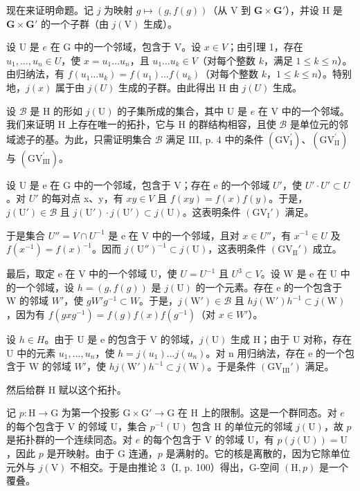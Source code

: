 现在来证明命题。记 \(j\) 为映射 \(g \mapsto (g, f(g))\)（从 V 到 \(\mathbf{G} \times \mathbf{G}'\)），并设 H 是 \(\mathbf{G} \times \mathbf{G}'\) 的一个子群（由 \(j(\mathrm{V})\) 生成）。

设 U 是 \(e\) 在 G 中的一个邻域，包含于 V。设 \(x \in V\)；由引理 1，存在 \(u_1, \ldots, u_n \in U\)，使 \(x = u_1 \ldots u_n\)，且 \(u_1 \ldots u_k \in V\)（对每个整数 \(k\)，满足 \(1 \leqslant k \leqslant n\)）。由归纳法，有 \(f(u_1 \ldots u_k) = f(u_1) \ldots f(u_k)\)（对每个整数 \(k\)，\(1 \leqslant k \leqslant n\)）。特别地，\(j(x)\) 属于由 \(j(U)\) 生成的子群。由此得出 H 由 \(j(U)\) 生成。

设 \(\mathcal{B}\) 是 H 的形如 \(j(\mathrm{U})\) 的子集所成的集合，其中 U 是 \(e\) 在 V 中的一个邻域。我们来证明 H 上存在唯一的拓扑，它与 H 的群结构相容，且使 \(\mathcal{B}\) 是单位元的邻域滤子的基。为此，只需证明集合 \(\mathcal{B}\) 满足 III, p. 4 中的条件 \((\mathrm{GV}_{\mathrm{I}}^{\prime})\)、\((\mathrm{GV}_{\mathrm{II}}^{\prime})\) 与 \((\mathrm{GV}_{\mathrm{III}}^{\prime})\)。

设 U 是 e 在 G 中的一个邻域，包含于 V；存在 e 的一个邻域 \(U'\)，使 \(U' \cdot U' \subset U\)。对 \(U'\) 的每对点 x、y，有 \(xy \in V\) 且 \(f(xy) = f(x)f(y)\)。于是，\(j(\mathrm{U}') \in \mathcal{B}\) 且 \(j(\mathrm{U}') \cdot j(\mathrm{U}') \subset j(\mathrm{U})\)。这表明条件 \((\mathrm{GV}_{\mathrm{I}}')\) 满足。

于是集合 \(U'' = V \cap U^{-1}\) 是 e 在 V 中的一个邻域，且对 \(x \in U''\)，有 \(x^{-1} \in U\) 及 \(f(x^{-1}) = f(x)^{-1}\)。因而 \(j(\mathrm{U}'')^{-1} \subset j(\mathrm{U})\)，这表明条件 \((\mathrm{GV}_{\mathrm{II}}' )\) 成立。

最后，取定 e 在 V 中的一个邻域 U，使 \(U = U^{-1}\) 且 \(U^{3} \subset V\)。设 W 是 e 在 U 中的一个邻域，设 \(h = (g, f(g))\) 是 \(j(\mathrm{U})\) 的一个元素。存在 e 的一个包含于 W 的邻域 \(W'\)，使 \(gW'g^{-1} \subset W\)。于是，\(j(\mathrm{W}') \in \mathcal{B}\) 且 \(hj(\mathrm{W}')h^{-1} \subset j(\mathrm{W})\)，因为有 \(f(gxg^{-1}) = f(g)f(x)f(g^{-1})\)（对 \(x \in W'\)）。

设 \(h \in H\)。由于 U 是 e 的包含于 V 的邻域，\(j(\mathrm{U})\) 生成 H；由于 U 对称，存在 U 中的元素 \(u_{1}, \ldots, u_{n}\)，使 \(h = j(u_{1}) \ldots j(u_{n})\)。对 n 用归纳法，存在 e 的一个包含于 W 的邻域 \(W'\)，使 \(hj(\mathrm{W}')h^{-1} \subset j(\mathrm{W})\)。于是条件 \((\mathrm{GV}_{\mathrm{III}}')\) 满足。

然后给群 H 赋以这个拓扑。

记 \(p \colon \mathrm{H} \to \mathrm{G}\) 为第一个投影 \(\mathrm{G} \times \mathrm{G}' \to \mathrm{G}\) 在 H 上的限制。这是一个群同态。对 \(e\) 的每个包含于 V 的邻域 U，集合 \(p^{-1}(\mathrm{U})\) 包含 H 的单位元的邻域 \(j(\mathrm{U})\)，故 \(p\) 是拓扑群的一个连续同态。对 \(e\) 的每个包含于 V 的邻域 U，有 \(p(j(\mathrm{U})) = \mathrm{U}\)，因此 \(p\) 是开映射。由于 G 连通，\(p\) 是满射的。它的核是离散的，因为它除单位元外与 \(j(\mathrm{V})\) 不相交。于是由推论 3（I, p. 100）得出，G-空间 \((\mathrm{H}, p)\) 是一个覆叠。

